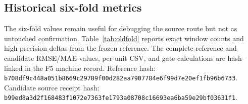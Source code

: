 \documentclass[journal]{IEEEtran}
\begin{document}
\subsection{Historical six-fold metrics}
The six-fold values remain useful for debugging the source route but not as untouched confirmation. Table~\ref{tab:oldfold} reports exact window counts and high-precision deltas from the frozen reference. The complete reference and candidate RMSE/MAE values, per-unit CSV, and gate calculations are hash-linked in the F5 machine record. Reference hash: \texttt{b708df9c\allowbreak 448a051b\allowbreak 8669c297\allowbreak 89f00d28\allowbreak 2aa79077\allowbreak 84e6f99d\allowbreak 7e20ef1f\allowbreak b96b6733}. Candidate source receipt hash: \texttt{b99ed8a3\allowbreak d2f16848\allowbreak 3f1072e7\allowbreak 363fe179\allowbreak 3a08708c\allowbreak 16693ea6\allowbreak ba59e29b\allowbreak f03631f1}.
\begin{table}[t]
\centering
\caption{Historical metrics retained as development/diagnostic evidence. Delta equals candidate minus reference; all calculations use unrounded values.}
\label{tab:oldfold}
\scriptsize
{}
\end{table}
\end{document}
